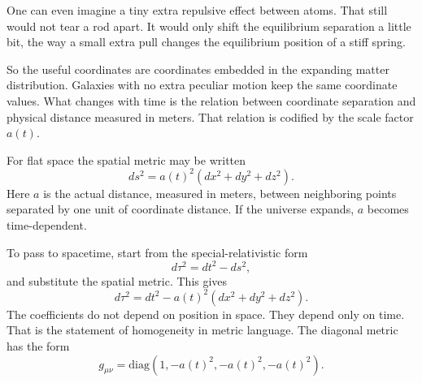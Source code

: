 One can even imagine a tiny extra repulsive effect between atoms. That still would not tear a rod apart. It would only shift the equilibrium separation a little bit, the way a small extra pull changes the equilibrium position of a stiff spring.

\begin{classroomqa}
\end{classroomqa}

So the useful coordinates are coordinates embedded in the expanding matter distribution. Galaxies with no extra peculiar motion keep the same coordinate values. What changes with time is the relation between coordinate separation and physical distance measured in meters. That relation is codified by the scale factor \(a(t)\).

For flat space the spatial metric may be written
\begin{equation}
ds^2 = a(t)^2\left(dx^2+dy^2+dz^2\right).
\end{equation}
Here \(a\) is the actual distance, measured in meters, between neighboring points separated by one unit of coordinate distance. If the universe expands, \(a\) becomes time-dependent.

To pass to spacetime, start from the special-relativistic form
\begin{equation}
d\tau^2 = dt^2 - ds^2,
\end{equation}
and substitute the spatial metric. This gives
\begin{equation}
d\tau^2 = dt^2 - a(t)^2\left(dx^2+dy^2+dz^2\right).
\end{equation}
The coefficients do not depend on position in space. They depend only on time. That is the statement of homogeneity in metric language. The diagonal metric has the form
\begin{equation}
g_{\mu\nu}=\mathrm{diag}\!\left(1,-a(t)^2,-a(t)^2,-a(t)^2\right).
\end{equation}

